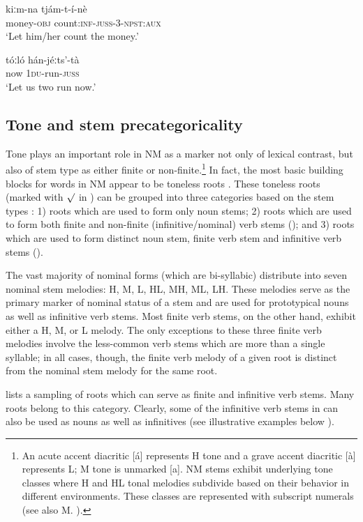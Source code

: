 \documentclass[output=paper]{langsci/langscibook}
\begin{document}
\ea\label{ex:mahland:14}
\gll kiːm-na        tjám-t-í-nè\\
money-\textsc{obj}   count:\textsc{inf-juss-3-npst:aux}\\
\glt `Let him/her count the money.'
\z

\ea\label{ex:mahland:15}
\gll tóːló    hán-jéːts'-tà  \\
now    \textsc{1du}{}-run\textsc{{}-juss}\\
\glt `Let us two run now.' 
\z

\subsection{Tone and stem precategoricality}\label{sec:mahland:1.3}

Tone plays an important role in NM as a marker not only of lexical contrast, but also of stem type as either finite or non-finite.\footnote{An acute accent diacritic [á] represents H tone and a grave accent diacritic [à] represents L; M tone is unmarked [a]. NM stems exhibit underlying tone classes where H and HL tonal melodies subdivide based on their behavior in different environments. These classes are represented with subscript numerals (see also M. \citealt[146]{Ahland2012}).} In fact, the most basic building blocks for words in NM appear to be toneless roots \citep[182]{Ahland2012}. These toneless roots (marked with ${\surd}$ in ) can be grouped into three categories based on the stem types \citep{Ahland2014a}: 1) roots which are used to form only noun stems; 2) roots which are used to form both finite and non-finite (infinitive/nominal) verb stems (); and 3) roots which are used to form distinct noun stem, finite verb stem and infinitive verb stems (). 

The vast majority of nominal forms (which are bi-syllabic) distribute into seven nominal stem melodies: H, M, L, HL, MH, ML, LH. These melodies serve as the primary marker of nominal status of a stem and are used for prototypical nouns as well as infinitive verb stems. Most finite verb stems, on the other hand, exhibit either a H, M, or L melody. The only exceptions to these three finite verb melodies involve the less-common verb stems which are more than a single syllable; in all cases, though, the finite verb melody of a given root is distinct from the nominal stem melody for the same root. 

 lists a sampling of roots which can serve as finite and infinitive verb  stems. Many roots belong to this category. Clearly, some of the infinitive verb stems in  can also be used as nouns as well as infinitives (see illustrative examples below ). 
\end{document}
